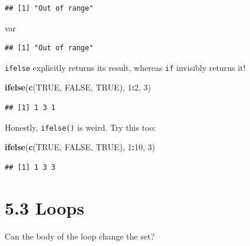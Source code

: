 \documentclass[]{book}
\newenvironment{Shaded}{\begin{snugshade}}{\end{snugshade}}
\newcommand{\DecValTok}[1]{\textcolor[rgb]{0.00,0.00,0.81}{#1}}
\newcommand{\KeywordTok}[1]{\textcolor[rgb]{0.13,0.29,0.53}{\textbf{#1}}}
\newcommand{\NormalTok}[1]{#1}
\newcommand{\OperatorTok}[1]{\textcolor[rgb]{0.81,0.36,0.00}{\textbf{#1}}}
\newcommand{\OtherTok}[1]{\textcolor[rgb]{0.56,0.35,0.01}{#1}}
\begin{document}
\begin{verbatim}
## [1] "Out of range"
\end{verbatim}

\begin{Shaded}
\begin{Highlighting}[]
\NormalTok{var}
\end{Highlighting}
\end{Shaded}

\begin{verbatim}
## [1] "Out of range"
\end{verbatim}

\texttt{ifelse} explicitly returns its result, whereas \texttt{if} invisibly returns it!

\begin{Shaded}
\begin{Highlighting}[]
\KeywordTok{ifelse}\NormalTok{(}\KeywordTok{c}\NormalTok{(}\OtherTok{TRUE}\NormalTok{, }\OtherTok{FALSE}\NormalTok{, }\OtherTok{TRUE}\NormalTok{), }\DecValTok{1}\OperatorTok{:}\DecValTok{2}\NormalTok{, }\DecValTok{3}\NormalTok{)}
\end{Highlighting}
\end{Shaded}

\begin{verbatim}
## [1] 1 3 1
\end{verbatim}

Honestly, \texttt{ifelse()} is weird. Try this too:

\begin{Shaded}
\begin{Highlighting}[]
\KeywordTok{ifelse}\NormalTok{(}\KeywordTok{c}\NormalTok{(}\OtherTok{TRUE}\NormalTok{, }\OtherTok{FALSE}\NormalTok{, }\OtherTok{TRUE}\NormalTok{), }\DecValTok{1}\OperatorTok{:}\DecValTok{10}\NormalTok{, }\DecValTok{3}\NormalTok{)}
\end{Highlighting}
\end{Shaded}

\begin{verbatim}
## [1] 1 3 3
\end{verbatim}

\hypertarget{loops}{%
\section*{5.3 Loops}\label{loops}}

Can the body of the loop change the set?
\end{document}
